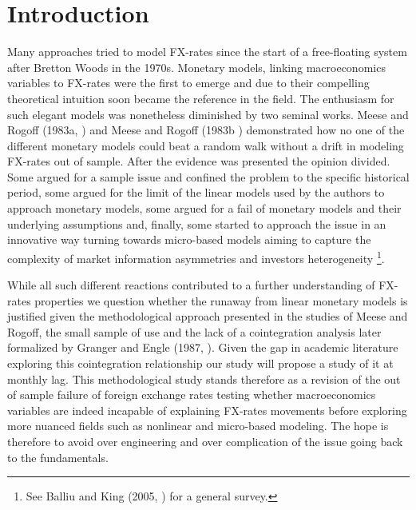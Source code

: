 \section{Introduction}

%
%
Many approaches tried to model FX-rates since the start of a free-floating system after Bretton Woods in the 1970s. Monetary models, linking macroeconomics variables to FX-rates were the first to emerge and due to their compelling theoretical intuition soon became the reference in the field. The enthusiasm for such elegant models was nonetheless diminished by two seminal works. Meese and Rogoff (1983a, \cite{MeeseRogoffa}) and Meese and Rogoff (1983b \cite{MeeseRogoffb}) demonstrated how no one of the different monetary models could beat a random walk without a drift in modeling FX-rates out of sample. After the evidence was presented the opinion divided. Some argued for a sample issue and confined the problem to the specific historical period, some argued for the limit of the linear models used by the authors to approach monetary models, some argued for a fail of monetary models and their underlying assumptions and, finally, some started to approach the issue in an innovative way turning towards micro-based models aiming to capture the complexity of market information asymmetries and investors heterogeneity \footnote{See Balliu and King (2005, \cite{BalliuKing}) for a general survey.}.

While all such different reactions contributed to a further understanding of FX-rates properties we question whether the runaway from linear monetary models is justified given the methodological approach presented in the studies of Meese and Rogoff, the small sample of use and the lack of a cointegration analysis later formalized by Granger and Engle (1987,  \cite{EngleGranger}). Given the gap in academic literature exploring this cointegration relationship our study will propose a study of it at monthly lag.  %
% 
%
This methodological study stands therefore as a revision of the out of sample failure of foreign exchange rates testing whether macroeconomics variables are indeed incapable of explaining FX-rates movements before exploring more nuanced fields such as nonlinear and micro-based modeling. The hope is therefore to avoid over engineering and over complication of the issue going back to the fundamentals.

